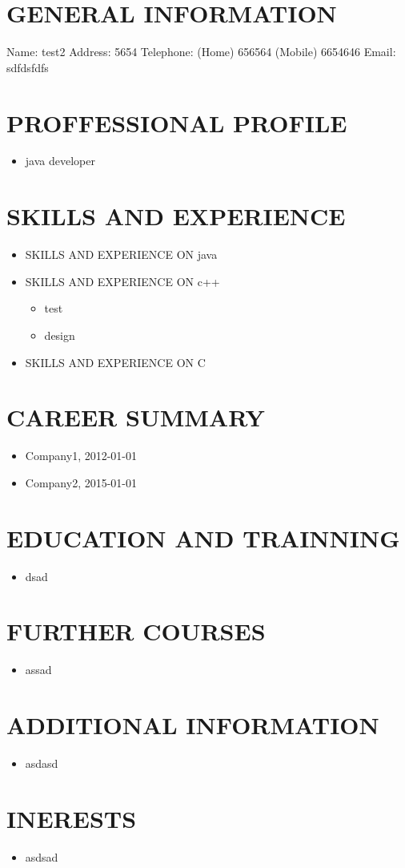 \documentclass{article}
\begin{document}
 
\section{GENERAL INFORMATION}
Name: test2
Address: 5654
Telephone: (Home) 656564 (Mobile) 6654646
Email: sdfdsfdfs
\section{PROFFESSIONAL PROFILE}
\begin{itemize}
\item java developer
\end{itemize}
\section{SKILLS AND EXPERIENCE}
\begin{itemize}
\item SKILLS AND EXPERIENCE ON java
\item SKILLS AND EXPERIENCE ON c++
\begin{itemize}
\item test
\item design
\end{itemize}
\item SKILLS AND EXPERIENCE ON C
\end{itemize}
\section{CAREER SUMMARY}
\begin{itemize}
\item Company1, 2012-01-01
\item Company2, 2015-01-01
\end{itemize}
\section{EDUCATION AND TRAINNING}
\begin{itemize}
\item dsad
\end{itemize}
\section{FURTHER COURSES}
\begin{itemize}
\item assad
\end{itemize}
\section{ADDITIONAL INFORMATION}
\begin{itemize}
\item asdasd
\end{itemize}
\section{INERESTS}
\begin{itemize}
\item asdsad
\end{itemize}
\end{document}
